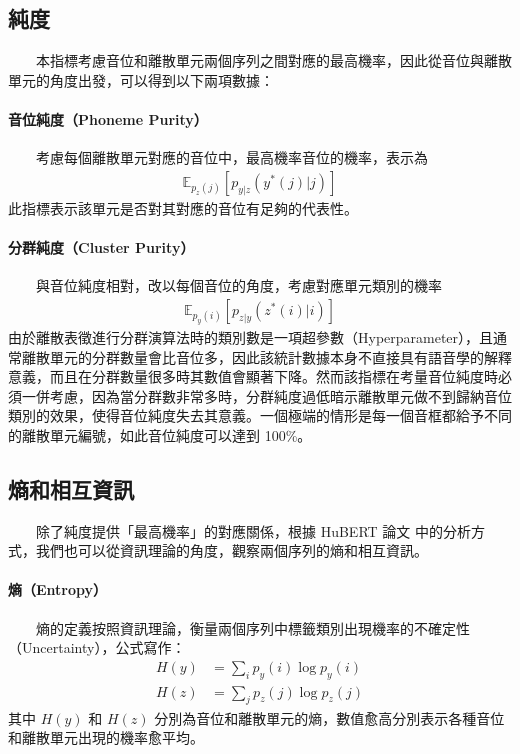 \subsection{純度}

　　本指標考慮音位和離散單元兩個序列之間對應的最高機率，因此從音位與離散單元的角度出發，可以得到以下兩項數據：

\paragraph{音位純度（Phoneme Purity）}\hfill \break
%
　　考慮每個離散單元對應的音位中，最高機率音位的機率，表示為
\begin{align}
    \mathbb{E}_{p_z(j)}\left[p_{y|z}(y^*(j)|j) \right]
\end{align}
此指標表示該單元是否對其對應的音位有足夠的代表性。

\paragraph{分群純度（Cluster Purity）}\hfill \break
%
　　與音位純度相對，改以每個音位的角度，考慮對應單元類別的機率
\begin{align}
    \mathbb{E}_{p_y(i)}\left[p_{z|y}(z^*(i)|i) \right]
\end{align}
        由於離散表徵進行分群演算法時的類別數是一項超參數（Hyperparameter），且通常離散單元的分群數量會比音位多，因此該統計數據本身不直接具有語音學的解釋意義，而且在分群數量很多時其數值會顯著下降。然而該指標在考量音位純度時必須一併考慮，因為當分群數非常多時，分群純度過低暗示離散單元做不到歸納音位類別的效果，使得音位純度失去其意義。一個極端的情形是每一個音框都給予不同的離散單元編號，如此音位純度可以達到 100\%。

\subsection{熵和相互資訊}

　　除了純度提供「最高機率」的對應關係，根據 HuBERT 論文 \cite{hsu_hubert_2021-2} 中的分析方式，我們也可以從資訊理論的角度，觀察兩個序列的熵和相互資訊。

\paragraph{熵（Entropy）} \hfill \break
%
　　熵的定義按照資訊理論，衡量兩個序列中標籤類別出現機率的不確定性（Uncertainty），公式寫作：
\begin{align}
    H(y) & = \sum_i{p_y(i)\log p_y(i)} \\
    H(z) & = \sum_j{p_z(j)\log p_z(j)}
\end{align}
其中 $H(y)$ 和 $H(z)$ 分別為音位和離散單元的熵，數值愈高分別表示各種音位和離散單元出現的機率愈平均。

